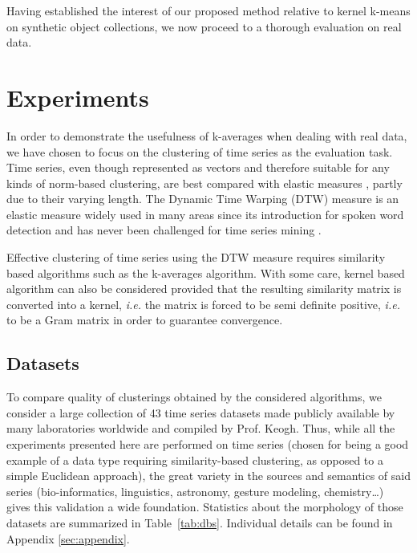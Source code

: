 \documentclass[natbib,smallextended]{svjour3}
\begin{document}
Having established the interest of our proposed method relative to kernel k-means on synthetic object collections, we now proceed to a thorough evaluation on real data.

\section{Experiments}
\label{sec:experiments}

In order to demonstrate the usefulness of k-averages when dealing with real data, we have chosen to focus on the clustering of time series as the evaluation task. Time series, even though represented as vectors and therefore suitable for any kinds of norm-based clustering, are best compared with elastic measures \citep{Ding:2008:QMT:1454159.1454226, Wang:2013:ECR:2429736.2429754}, partly due to their varying length. The Dynamic Time Warping (DTW) measure is an elastic measure widely used in many areas since its introduction for spoken word detection \citep{1163055} and has never been challenged for time series mining \citep{conf/kdd/BerndtC94, Rakthanmanon:2013:ABD:2513092.2500489}.

Effective clustering of time series using the DTW measure requires similarity based algorithms such as the k-averages algorithm. With some care, kernel based algorithm can also be considered provided that the resulting similarity matrix is converted into a kernel, \textit{i.e.} the matrix is forced to be semi definite positive, \textit{i.e.} to be a Gram matrix \citep{Lanckriet:2004:LKM:1005332.1005334} in order to guarantee convergence.

\subsection{Datasets}

To compare quality of clusterings obtained by the considered algorithms, we consider a large collection of 43 time series datasets made publicly available by many laboratories worldwide and compiled by Prof. Keogh. Thus, while all the experiments presented here are performed on time series (chosen for being a good example of a data type requiring similarity-based clustering, as opposed to a simple Euclidean approach), the great variety in the sources and semantics of said series (bio-informatics, linguistics, astronomy, gesture modeling, chemistry\ldots{}) gives this validation a wide foundation. Statistics about the morphology of those datasets are summarized in Table~\ref{tab:dbs}. Individual details can be found in Appendix \ref{sec:appendix}.
\end{document}
